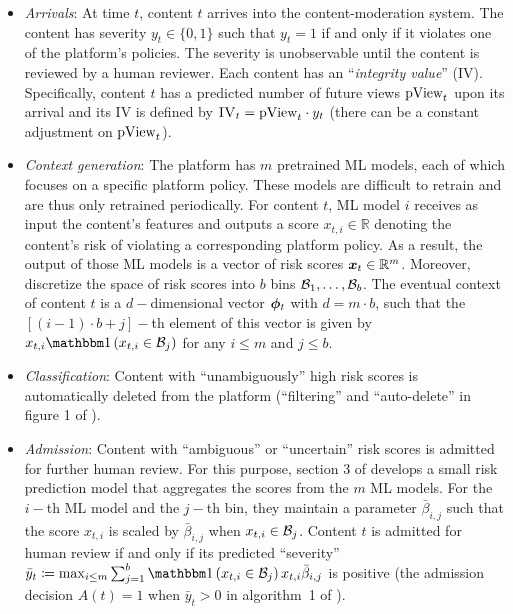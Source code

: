 \begin{itemize}
\item \emph{Arrivals}: At time $t$, content  $t$ arrives into the content-moderation system. The content has severity $y_t \in \{0,1\}$ such that $y_t = 1$ if and only if it violates one of the platform's policies. The severity is unobservable until the content is reviewed by a human reviewer. Each content has an ``\emph{integrity value}'' (IV). Specifically, content $t$ has a predicted number of future views $\text{pView}_t$ upon its arrival and its IV is defined by $\textsc{IV}_t = \text{pView}_t \cdot y_t$ (there can be a constant adjustment on $\text{pView}_t$). 
\item \emph{Context generation}: The platform has $m$ pretrained ML models, each of which focuses on a specific platform policy. These models are difficult to retrain and are thus only retrained periodically. For content $t$, ML model $i$ receives as input the content's features and outputs a score $x_{t,i} \in \mathbb{R}$ denoting the content's risk of violating a corresponding platform policy. As a result, the output of those ML models is  a vector of risk scores $\boldsymbol{x}_t \in \mathbb{R}^m$. Moreover, \cite{Avadhanula2022} discretize the space of risk scores into $b$ bins $\mathcal{B}_1,\ldots,\mathcal{B}_b$. The eventual context of content $t$ is a $d-$dimensional vector $\boldsymbol{\phi}_t$ with $d = m \cdot b$, such that the $[(i-1)\cdot b + j]-$th element of this vector is given by $x_{t,i}\indic{x_{t,i} \in \set{B}_j}$ for any $i \leq m$ and $j \leq b$.
\item \emph{Classification}: Content with ``unambiguously'' high risk scores is automatically deleted from the platform (``filtering'' and ``auto-delete'' in figure 1 of \cite{Avadhanula2022}).
\item \emph{Admission}: Content with ``ambiguous'' or ``uncertain'' risk scores is admitted for further human review. 
For this purpose, section 3 of \cite{Avadhanula2022} develops a small risk prediction model that aggregates the scores from the $m$ ML models.  For the $i-$th ML model and the $j-$th bin, they maintain a parameter $\bar{\beta}_{i,j}$ such that the score $x_{t,i}$ is scaled by $\bar{\beta}_{i,j}$ when $x_{t,i} \in \mathcal{B}_j$. Content $t$ is admitted for human review if and only if its predicted ``severity'' $\bar{y}_t \coloneqq \max_{i \leq m} \sum_{j=1}^b \indic{x_{t,i} \in \set{B}_j}x_{t,i} \bar{\beta}_{i,j} $ is positive (the admission decision $A(t) = 1$ when $\bar{y}_t > 0$ in algorithm~1 of \cite{Avadhanula2022}). 


\end{itemize}
